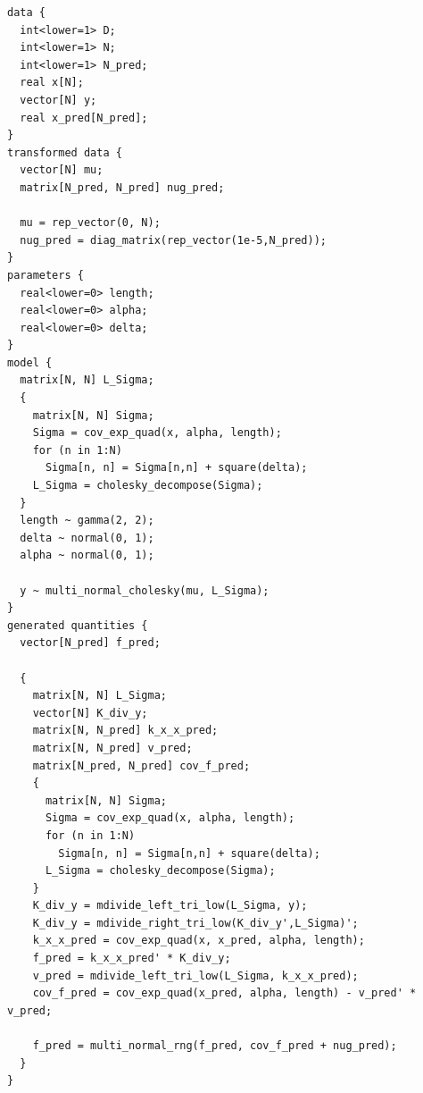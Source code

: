 \documentclass{article}
\begin{document}
\begin{verbatim}
data {
  int<lower=1> D;
  int<lower=1> N;
  int<lower=1> N_pred;
  real x[N];
  vector[N] y;
  real x_pred[N_pred];
}
transformed data {
  vector[N] mu;
  matrix[N_pred, N_pred] nug_pred;

  mu = rep_vector(0, N);
  nug_pred = diag_matrix(rep_vector(1e-5,N_pred));
}
parameters {
  real<lower=0> length;
  real<lower=0> alpha;
  real<lower=0> delta;
}
model {
  matrix[N, N] L_Sigma;
  {
    matrix[N, N] Sigma;
    Sigma = cov_exp_quad(x, alpha, length);
    for (n in 1:N)
      Sigma[n, n] = Sigma[n,n] + square(delta);
    L_Sigma = cholesky_decompose(Sigma);
  }
  length ~ gamma(2, 2);
  delta ~ normal(0, 1);
  alpha ~ normal(0, 1);

  y ~ multi_normal_cholesky(mu, L_Sigma);
}
generated quantities {
  vector[N_pred] f_pred;

  {
    matrix[N, N] L_Sigma;
    vector[N] K_div_y;
    matrix[N, N_pred] k_x_x_pred;
    matrix[N, N_pred] v_pred;
    matrix[N_pred, N_pred] cov_f_pred;
    {
      matrix[N, N] Sigma;
      Sigma = cov_exp_quad(x, alpha, length);
      for (n in 1:N)
        Sigma[n, n] = Sigma[n,n] + square(delta);
      L_Sigma = cholesky_decompose(Sigma);
    }
    K_div_y = mdivide_left_tri_low(L_Sigma, y);
    K_div_y = mdivide_right_tri_low(K_div_y',L_Sigma)';
    k_x_x_pred = cov_exp_quad(x, x_pred, alpha, length);
    f_pred = k_x_x_pred' * K_div_y; 
    v_pred = mdivide_left_tri_low(L_Sigma, k_x_x_pred);
    cov_f_pred = cov_exp_quad(x_pred, alpha, length) - v_pred' * v_pred;

    f_pred = multi_normal_rng(f_pred, cov_f_pred + nug_pred);
  }
}
\end{verbatim}




\end{document}
